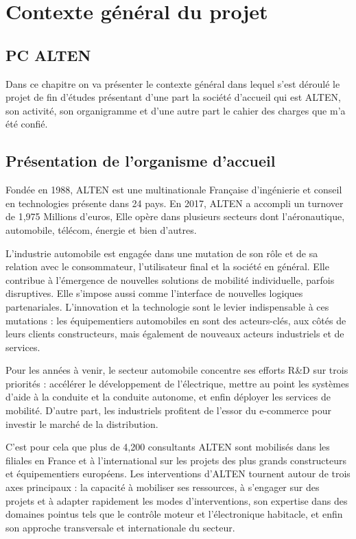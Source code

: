 \chapter{Contexte général du projet}
\section*{PC ALTEN}
Dans ce chapitre on va présenter le contexte général dans lequel s’est déroulé le projet de fin d’études présentant d’une part la société d’accueil qui est ALTEN, son activité, son organigramme et d’une autre part le cahier des charges que m’a été confié.

\section{Présentation de l'organisme d'accueil}
Fondée en 1988, ALTEN est une multinationale Française d’ingénierie et conseil en technologies présente dans 24 pays. En 2017, ALTEN a accompli un turnover de 1,975 Millions d’euros, Elle opère dans plusieurs secteurs dont l’aéronautique, automobile, télécom, énergie et bien d’autres. 

L’industrie automobile est engagée dans une mutation de son rôle et de sa relation avec le consommateur, l’utilisateur final et la société en général. Elle contribue à l’émergence de nouvelles solutions de mobilité individuelle, parfois disruptives. Elle s’impose aussi comme l’interface de nouvelles logiques partenariales. L’innovation et la technologie sont le levier indispensable à ces mutations : les équipementiers automobiles en sont des acteurs-clés, aux côtés de leurs clients constructeurs, mais également de nouveaux acteurs industriels et de services.

Pour les années à venir, le secteur automobile concentre ses efforts R\&D sur trois priorités : accélérer le développement de l’électrique, mettre au point les systèmes d’aide à la conduite et la conduite autonome, et enfin déployer les services de mobilité. D’autre part, les industriels profitent de l’essor du e-commerce pour investir le marché de la distribution.

C’est pour cela que plus de 4,200 consultants ALTEN sont mobilisés dans les filiales en France et à l’international sur les projets des plus grands constructeurs et équipementiers européens. Les interventions d’ALTEN tournent autour de trois axes principaux : la capacité à mobiliser ses ressources, à s’engager sur des projets et à adapter rapidement les modes d’interventions, son expertise dans des domaines pointus tels que le contrôle moteur et l’électronique habitacle, et enfin son approche transversale et internationale du secteur.

